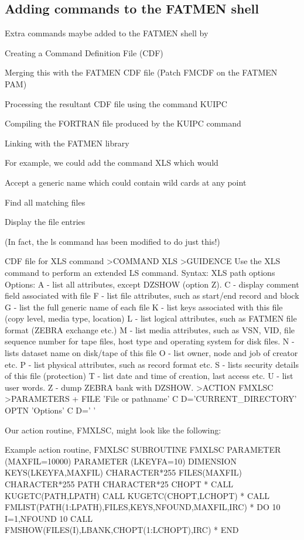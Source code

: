 \subsection{Adding commands to the FATMEN shell}
\par
Extra commands maybe added to the FATMEN shell by
\begin{OL}
\item
Creating a Command Definition File (CDF)
\item
Merging this with the FATMEN CDF file (Patch FMCDF on the FATMEN PAM)
\item
Processing the resultant CDF file using the command KUIPC
\item
Compiling the FORTRAN file produced by the KUIPC command
\item
Linking with the FATMEN library
\end{OL}
\par
For example, we could add the command XLS which would
\begin{OL}
\item
Accept a generic name which could contain wild cards at any point
\item
Find all matching files
\item
Display the file entries
\end{OL}
(In fact, the ls command has been modified to do just this!)
\begin{XMPt}{CDF file for XLS command}
>COMMAND XLS
>GUIDENCE
Use the XLS command to perform an extended LS command.
Syntax: XLS path options
Options:
  A - list all attributes, except DZSHOW (option Z).
  C - display comment field associated with file
  F - list file attributes, such as start/end record and block
  G - list the full generic name of each file
  K - list keys associated with this file (copy level, media type, location)
  L - list logical attributes, such as FATMEN file format
      (ZEBRA exchange etc.)
  M - list media attributes, such as VSN, VID, file sequence number for tape
      files, host type and operating system for disk files.
  N - lists dataset name on disk/tape of this file
  O - list owner, node and job of creator etc.
  P - list physical attributes, such as record format etc.
  S - lists security details of this file (protection)
  T - list date and time of creation, last access etc.
  U - list user words.
  Z - dump ZEBRA bank with DZSHOW.
>ACTION FMXLSC
>PARAMETERS
+
FILE 'File or pathname' C D='CURRENT_DIRECTORY'
OPTN 'Options'          C D=' '
\end{XMPt}
\par
Our action routine, FMXLSC, might look like the following:
\begin{XMPt}{Example action routine, FMXLSC}
      SUBROUTINE FMXLSC
      PARAMETER     (MAXFIL=10000)
      PARAMETER     (LKEYFA=10)
      DIMENSION     KEYS(LKEYFA,MAXFIL)
      CHARACTER*255 FILES(MAXFIL)
      CHARACTER*255 PATH
      CHARACTER*25  CHOPT
*
      CALL KUGETC(PATH,LPATH)
      CALL KUGETC(CHOPT,LCHOPT)
*
      CALL FMLIST(PATH(1:LPATH),FILES,KEYS,NFOUND,MAXFIL,IRC)
*
      DO 10 I=1,NFOUND
10    CALL FMSHOW(FILES(I),LBANK,CHOPT(1:LCHOPT),IRC)
*
      END
\end{XMPt}

